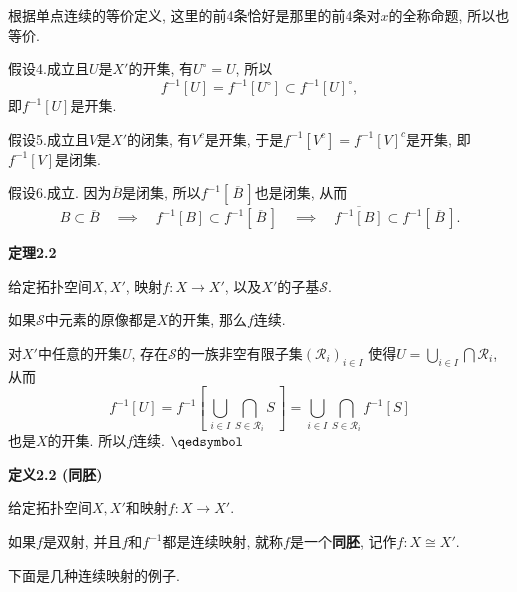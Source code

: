 \documentclass[UTF8]{ctexart}
\begin{document}

根据单点连续的等价定义, 这里的前4条恰好是那里的前4条对$x$的全称命题, 所以也等价.


假设4.成立且$U$是$X'$的开集, 有$U^\circ=U$, 所以
\[
    f^{-1}[U]=f^{-1}[U^\circ]\subset f^{-1}[U]^\circ,
\]
即$f^{-1}[U]$是开集.


假设5.成立且$V$是$X'$的闭集, 有$V^c$是开集, 于是$f^{-1}[V^c]=f^{-1}[V]^c$是开集,
即$f^{-1}[V]$是闭集.


假设6.成立. 因为$\overline{B}$是闭集, 所以$f^{-1}[\,\overline{B}\,]$也是闭集, 从而
\begin{equation*}
    B\subset\overline{B}\quad\implies\quad
    f^{-1}[B]\subset f^{-1}[\,\overline{B}\,]\quad\implies\quad
    \overline{f^{-1}[B]}\subset f^{-1}[\,\overline{B}\,].
\tag*{\qedsymbol}\end{equation*}

\vspace{10pt}

\hypertarget{sec:定理2.2}{}
\noindent\textbf{定理2.2}

给定拓扑空间$X,X'$, 映射$f:X\to X'$, 以及$X'$的子基$\mathcal{S}$.

如果$\mathcal{S}$中元素的原像都是$X$的开集, 那么$f$连续.


对$X'$中任意的开集$U$, 存在$\mathcal{S}$的一族非空有限子集$(\mathcal{R}_i)_{i\in I}$
使得$\displaystyle U=\bigcup_{i\in I}\bigcap\mathcal{R}_i$, 从而
\[
    f^{-1}[U]=f^{-1}\left[\,\bigcup_{i\in I}\bigcap_{S\in\mathcal{R}_i}S\,\right]=
    \bigcup_{i\in I}\bigcap_{S\in\mathcal{R}_i}f^{-1}[S]
\]
也是$X$的开集. 所以$f$连续. \hfill $\qedsymbol$

\vspace{10pt}

\hypertarget{sec:定义2.2}{}
\noindent\textbf{定义2.2 (同胚)}

给定拓扑空间$X,X'$和映射$f:X\to X'$.

如果$f$是双射, 并且$f$和$f^{-1}$都是连续映射, 就称$f$是一个\textbf{同胚},
记作$f:X\cong X'$.





\newpage

下面是几种连续映射的例子.

\vspace{10pt}
\end{document}
